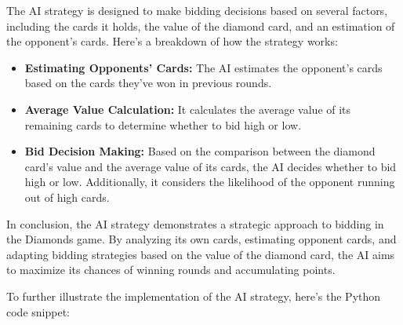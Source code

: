 \documentclass[letterpaper,12pt]{article}
\begin{document}
The AI strategy is designed to make bidding decisions based on several factors, including the cards it holds, the value of the diamond card, and an estimation of the opponent's cards. Here's a breakdown of how the strategy works:

\begin{itemize}
    \item \textbf{Estimating Opponents’ Cards:} The AI estimates the opponent's cards based on the cards they've won in previous rounds.
    \item \textbf{Average Value Calculation:} It calculates the average value of its remaining cards to determine whether to bid high or low.
    \item \textbf{Bid Decision Making:} Based on the comparison between the diamond card's value and the average value of its cards, the AI decides whether to bid high or low. Additionally, it considers the likelihood of the opponent running out of high cards.
\end{itemize}

In conclusion, the AI strategy demonstrates a strategic approach to bidding in the Diamonds game. By analyzing its own cards, estimating opponent cards, and adapting bidding strategies based on the value of the diamond card, the AI aims to maximize its chances of winning rounds and accumulating points.

To further illustrate the implementation of the AI strategy, here's the Python code snippet:
\end{document}
